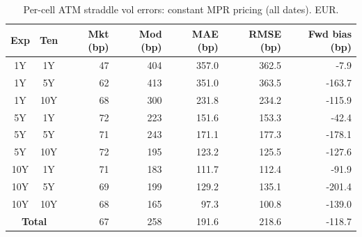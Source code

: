 \begin{table}[H]
\centering
\caption{Per-cell ATM straddle vol errors: constant MPR pricing (all dates). EUR.}
\label{tab:constant_mpr_marketF0_per_cell_all}
\small
\begin{tabular}{@{}ccrrrrr@{}}
\toprule
\textbf{Exp} & \textbf{Ten} & \textbf{Mkt (bp)} & \textbf{Mod (bp)} & \textbf{MAE (bp)} & \textbf{RMSE (bp)} & \textbf{Fwd bias (bp)} \\
\midrule
  1Y & 1Y & 47 & 404 & 357.0 & 362.5 & -7.9 \\
  1Y & 5Y & 62 & 413 & 351.0 & 363.5 & -163.7 \\
  1Y & 10Y & 68 & 300 & 231.8 & 234.2 & -115.9 \\
  \midrule
  5Y & 1Y & 72 & 223 & 151.6 & 153.3 & -42.4 \\
  5Y & 5Y & 71 & 243 & 171.1 & 177.3 & -178.1 \\
  5Y & 10Y & 72 & 195 & 123.2 & 125.5 & -127.6 \\
  \midrule
  10Y & 1Y & 71 & 183 & 111.7 & 112.4 & -91.9 \\
  10Y & 5Y & 69 & 199 & 129.2 & 135.1 & -201.4 \\
  10Y & 10Y & 68 & 165 & 97.3 & 100.8 & -139.0 \\
  \midrule
  \multicolumn{2}{c}{\textbf{Total}} & 67 & 258 & 191.6 & 218.6 & -118.7 \\
\bottomrule
\end{tabular}
\end{table}
